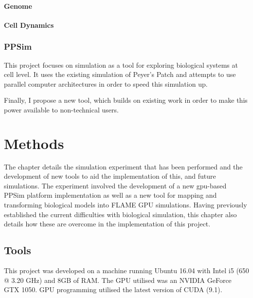 \documentclass{UoYCSproject}
\begin{document}
\subsubsection{Genome}


\subsubsection{Cell Dynamics}

\subsection{PPSim}
\label{ppsim}
This project focuses on simulation as a tool for exploring biological systems at cell level.
It uses the existing simulation of Peyer's Patch\cite{kieran_thesis} and attempts to use parallel computer architectures in order to speed this simulation up.

Finally, I propose a new tool, which builds on existing work in order to make this power available to non-technical users.

\chapter{Methods}
\label{methods}

The chapter details the simulation experiment that has been performed and the development of new tools to aid the implementation of this, and future simulations.
The experiment involved the development of a new \acrshort{gpu}-based PPSim platform implementation as well as a new tool for mapping and transforming biological models into \gls{FLAME GPU} simulations.
Having previously established the current difficulties with biological simulation, this chapter also details how these are overcome in the implementation of this project.

\section{Tools}
This project was developed on a machine running Ubuntu 16.04 with Intel i5 (650 @ 3.20 GHz) and 8GB of RAM.
The GPU utilised was an NVIDIA GeForce GTX 1050.
GPU programming utilised the latest version of CUDA (9.1).
\end{document}
